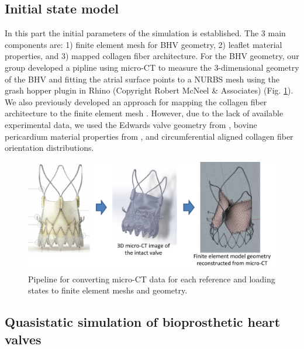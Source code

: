 \subsection{Initial state model}

    In this part the initial parameters of the simulation is established. The 3 main components are: 1) finite element mesh for BHV geometry, 2) leaflet material properties, and 3) mapped collagen fiber architecture. For the BHV geometry, our group developed a pipline using micro-CT to measure the 3-dimensional geometry of the BHV and fitting the atrial surface points to a NURBS mesh using the grash hopper plugin in Rhino (Copyright Robert McNeel \& Associates) (Fig. \ref{c6:fig:fegeometry}). We also previously developed an approach for mapping the collagen fiber architecture to the finite element mesh \cite{aggarwal_patient_2013,aggarwal_inverse_2015}. However, due to the lack of available experimental data, we used the Edwards valve geometry from \cite{aggarwal_inverse_2015}, bovine pericardium material properties from \cite{sacks_novel_2016}, and circumferential aligned collagen fiber orientation distributions.
    
\begin{figure}
\centering
\includegraphics[width=5.5in]{Images/chapter6/fegeometry.pdf}
\caption{Pipeline for converting micro-CT data for each reference and loading states to finite element meshs and geometry.}
\label{c6:fig:fegeometry}
\end{figure}

\subsection{Quasistatic simulation of bioprosthetic heart valves}


